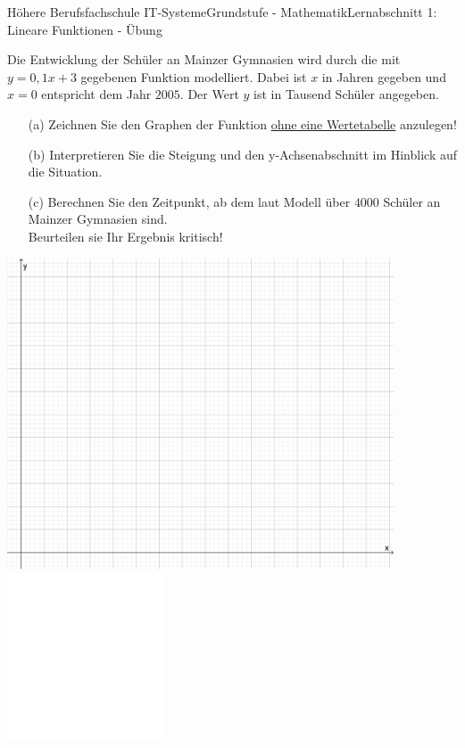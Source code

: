 \documentclass[oneside,openany,headings=optiontotoc,11pt,numbers=noenddot]{scrreprt}
\begin{document}
\begin{worksheet}{Höhere Berufsfachschule IT-Systeme}{Grundstufe - Mathematik}{Lernabschnitt 1: Lineare Funktionen - Übung}
\begin{framed}
		\end{framed}
		\normalsize
		\newpage
		\begin{framed}
			\noindent
			Die Entwicklung der Schüler an Mainzer Gymnasien wird durch die mit \(y=0,1x+3\) gegebenen Funktion modelliert. Dabei ist \(x\) in Jahren gegeben und \(x = 0\) entspricht dem Jahr \(2005\). Der Wert \(y\) ist in Tausend Schüler angegeben.
			\begin{itemize}
				\item[(a)] Zeichnen Sie den Graphen der Funktion \underline{ohne eine Wertetabelle} anzulegen!
				\item[(b)] Interpretieren Sie die Steigung und den y-Achsenabschnitt im Hinblick auf die Situation.
				\item[(c)] Berechnen Sie den Zeitpunkt, ab dem laut Modell über \(4000\) Schüler an Mainzer Gymnasien sind.\\
				Beurteilen sie Ihr Ergebnis kritisch!
			\end{itemize}
			\includegraphics[width=0.86\textwidth]{../99_Bilder/KoordLeer.png}\\
			\includegraphics[width=0.35\textwidth]{../../empty.jpg}
		\end{framed}
		\newpage
		

\end{worksheet}
\end{document}
